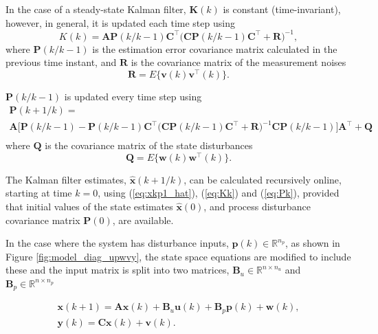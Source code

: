 In the case of a steady-state Kalman filter, $\mathbf{K}(k)$ is constant (time-invariant), however, in general, it is updated each time step using
\begin{equation} \label{eq:Kk}
	K(k) = \mathbf{A}\mathbf{P}(k/k-1)\mathbf{C}^\intercal \big(\mathbf{C}\mathbf{P}(k/k-1)\mathbf{C}^\intercal + \mathbf{R}\big)^{-1},
\end{equation}
where $\mathbf{P}(k/k-1)$ is the estimation error covariance matrix calculated in the previous time instant, and $\mathbf{R}$ is the covariance matrix of the measurement noises
\begin{equation} \label{eq:R}
	\mathbf{R} = E\{ \mathbf{v}(k) \mathbf{v}^\intercal(k) \}.
\end{equation}

$\mathbf{P}(k/k-1)$ is updated every time step using
\begin{multline} \label{eq:Pk}
	\mathbf{P}(k+1/k) = \\ \mathbf{A}\big[\mathbf{P}(k/k-1)
	- \mathbf{P}(k/k-1)\mathbf{C}^\intercal\big(\mathbf{C}\mathbf{P}(k/k-1)\mathbf{C}^\intercal + 
	\mathbf{R}\big)^{-1}\mathbf{C}\mathbf{P}(k/k-1) \big]\mathbf{A}^\intercal + \mathbf{Q} \\
\end{multline}
where $\mathbf{Q}$ is the covariance matrix of the state disturbances
\begin{equation} \label{eq:Q}
	\mathbf{Q} = E\{ \mathbf{w}(k) \mathbf{w}^\intercal(k) \}.
\end{equation}

The Kalman filter estimates, $\mathbf{\hat{x}}(k+1/k)$, can be calculated recursively online, starting at time $k=0$, using (\ref{eq:xkp1_hat}), (\ref{eq:Kk}) and (\ref{eq:Pk}), provided that initial values of the state estimates $\mathbf{\hat{x}}(0)$, and process disturbance covariance matrix $\mathbf{P}(0)$, are available.

In the case where the system has disturbance inputs, $\mathbf{p}(k) \in \mathbb{R}^{n_p}$, as shown in Figure \ref{fig:model_diag_upwvy}, the state space equations are modified to include these and the input matrix is split into two matrices, $\mathbf{B}_u \in \mathbb{R}^{n \times n_u}$ and $\mathbf{B}_p \in \mathbb{R}^{n \times n_p}$

\begin{equation} \label{eq:ss_rep_upwy}
	\begin{aligned}
		\mathbf{x}(k+1) = \mathbf{A} \mathbf{x}(k) + \mathbf{B}_u \mathbf{u}(k) + \mathbf{B}_p \mathbf{p}(k) + \mathbf{w}(k), \\
		\mathbf{y}(k) = \mathbf{C} \mathbf{x}(k) + \mathbf{v}(k).
	\end{aligned}
\end{equation}

